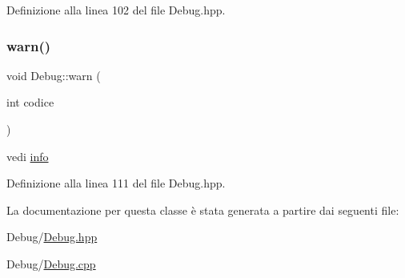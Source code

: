 Definizione alla linea 102 del file Debug.\+hpp.

\mbox{\label{class_debug_a1874722488c45685e073fc564c853901}} 
\subsubsection{\texorpdfstring{warn()}{warn()}}
{\footnotesize\ttfamily void Debug\+::warn (\begin{DoxyParamCaption}\item[{int}]{codice }\end{DoxyParamCaption})\hspace{0.3cm}{\ttfamily [inline]}}

vedi \hyperlink{class_debug_a9e8eec71718abfd7cca293c81bbd3409}{info} 

Definizione alla linea 111 del file Debug.\+hpp.



La documentazione per questa classe è stata generata a partire dai seguenti file\+:\begin{DoxyCompactItemize}
\item 
Debug/\hyperlink{_debug_8hpp}{Debug.\+hpp}\item 
Debug/\hyperlink{_debug_8cpp}{Debug.\+cpp}\end{DoxyCompactItemize}
